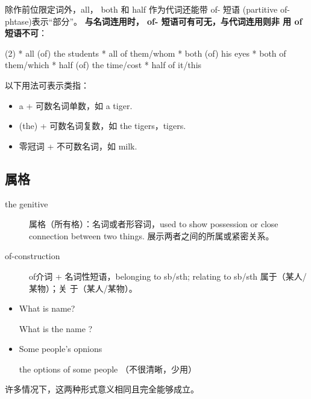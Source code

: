 除作前位限定词外，all， both 和 half 作为代词还能带 of- 短语 (partitive
of-phtase)表示“部分”。 \textbf{与名词连用时， of- 短语可有可无，与代词连用则非
  用 of短语不可}：
\begin{taskitem}(2)
  * all (of) the students
  * all of them/whom
  * both (of) his eyes
  * both of them/which
  * half (of) the time/cost
  * half of it/this
\end{taskitem}

以下用法可表示类指：
\begin{itemize}
\item a + 可数名词单数，如 a tiger.
\item (the) + 可数名词复数，如 the tigers，tigers.
\item 零冠词 + 不可数名词，如 milk.
\end{itemize}

\subsection{属格}

\begin{description}
\item[the genitive] 属格（所有格）：名词或者形容词，used to show possession or
  close connection between two things. 展示两者之间的所属或紧密关系。
\item[of-construction] of介词 + 名词性短语，belonging to sb/sth; relating to sb/sth 属于（某人/某物）；关
  于（某人/某物）。
\end{description}

\begin{itemize}
\item What is  name?

  What is the name ?

\item Some people's opnions

  the options of some people （不很清晰，少用）
\end{itemize}
许多情况下，这两种形式意义相同且完全能够成立。

